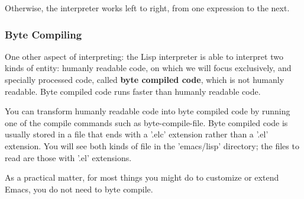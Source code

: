 \documentclass[12pt]{book}
\begin{document}
Otherwise, the interpreter works left to right, from one expression to the next.
\subsubsection{Byte Compiling}
One other aspect of interpreting: the Lisp interpreter is able to interpret two kinds of entity: humanly readable code, on which we will focus exclusively, and specially processed code, called {\bf byte compiled code}, which is not humanly readable. Byte compiled code runs faster than humanly readable code.

You can transform humanly readable code into byte compiled code by running one of the compile commands such as byte-compile-file. Byte compiled code is usually stored in a file that ends with a '.elc' extension rather than a '.el' extension. You will see both kinds of file in the 'emacs/lisp' directory; the files to read are those with '.el' extensions.

As a practical matter, for most things you might do to customize or extend Emacs, you do not need to byte compile.
\end{document}
